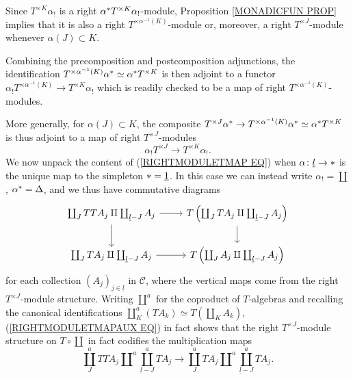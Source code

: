 \documentclass[a4paper,10pt]{article}%
\begin{document}
\begin{remark}\label{TALPHAKMOD REM}
	Since $T^{\times K} \alpha_{!}$ is a right 
	$\alpha^{\**} T^{\times K}\alpha_{!}$-module,
	Proposition \ref{MONADICFUN PROP} implies that it is also a 
	right $T^{\times \alpha^{-1}(K)}$-module or, moreover, a 
	right $T^{\times J}$-module whenever $\alpha(J) \subset K$.
\end{remark}


\begin{remark}\label{PRECOMPPOSTCOMP REM}
Combining the precomposition and postcomposition adjunctions,
the identification 
$T^{\times \alpha^{-1} (K)} \alpha^{\**} \simeq \alpha^{\**} T^{\times K}$
is then adjoint to a functor
$	\alpha_{!} T^{\times \alpha^{-1} (K)} 
	\to
	T^{\times K} \alpha_{!}$
which is readily checked to be a map of right $T^{\times \alpha^{-1} (K)}$-modules.

More generally, for $\alpha(J) \subset K$, the composite 
$T^{\times J}\alpha^{\**} \to T^{\times \alpha^{-1} (K)} \alpha^{\**} \simeq \alpha^{\**} T^{\times K}$ is thus adjoint to a map of right $T^{\times J}$-modules
\begin{equation}\label{RIGHTMODULETMAP EQ}
	\alpha_{!} T^{\times J} \to T^{\times K} \alpha_{!}.
\end{equation}
We now unpack the content of (\ref{RIGHTMODULETMAP EQ}) when 
$\alpha \colon \underline{l} \to \**$ is the unique map to the simpleton $\** = \underline{1}$. In this case we can instead write $\alpha_{!} = \coprod$, $\alpha^{\**}=\Delta$,
and we thus have commutative diagrams
\begin{equation}\label{RIGHTMODULETMAPAUX EQ}
\begin{tikzcd}
	\coprod_{J} TT A_j \amalg \coprod_{\underline{l}-J} A_j
	\ar{r} \ar{d} &
	T\left( \coprod_{J} T A_j \amalg \coprod_{\underline{l}-J} A_j \right) \ar{d}
\\
	\coprod_{J} T A_j \amalg \coprod_{\underline{l}-J} A_j
	\ar{r} &
		T\left( \coprod_{J} A_j \amalg \coprod_{\underline{l}-J} A_j \right)
\end{tikzcd}
\end{equation}
for each collection $\left( A_j \right)_{j\in\underline{l}}$ in $\mathcal{C}$,
where the vertical maps
come from the right $T^{\times J}$-module structure.
Writing $\amalg^a$ for the coproduct of $T$-algebras and recalling the canonical identifications 
$\coprod^a_K (T A_k) \simeq T\left( \coprod_K A_k \right)$, 
(\ref{RIGHTMODULETMAPAUX EQ}) in fact shows that the 
right $T^{\times J}$-module structure on $T \circ \coprod$
in fact codifies the multiplication maps
\[
\coprod^a_J TT A_j \amalg^a \coprod^a_{\underline{l}-J} T A_j
	\to
\coprod^a_J T A_j \amalg^a \coprod^a_{\underline{l}-J} T A_j.
\] 
\end{remark}
\end{document}
